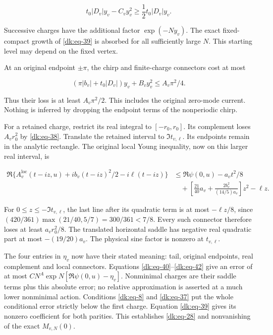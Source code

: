 \begin{equation}\label{dk:eq-40}
t_0|D_v|y_v-C_vy_v^2\ge\frac12t_0|D_v|y_v.
\end{equation}

Successive charges have the additional factor \(\exp(-Ny_v)\). The exact
fixed-compact growth of \eqref{dk:eq-39} is absorbed for all sufficiently large $N$.
This starting level may depend on the fixed vertex.

At an original endpoint \(\pm\pi\), the chirp and finite-charge connectors cost
at most

\begin{equation}\label{dk:eq-41}
(\pi|b_v|+t_0|D_v|)y_v+B_vy_v^2
                            \le A_v\pi^2/4.
\end{equation}

Thus their loss is at least \(A_v\pi^2/2\). This includes the original
zero-mode current. Nothing is inferred by dropping the endpoint terms
of the nonperiodic chirp.

For a retained charge, restrict its real integral to \([-r_0,r_0]\).
Its complement loses \(A_vr_0^2\) by \eqref{dk:eq-38}. Translate the retained interval
to \(\Im t_{v,\ell}\). Its endpoints remain in the analytic rectangle. The
original local Young inequality, now on this larger real interval,
is

\begin{equation}\label{dk:eq-42}
\begin{aligned}
 \Re\{A_v^{\mathrm{loc}}(t-iz,u)+ib_v(t-iz)^2/2-i\ell(t-iz)\}
 &\le\Re\psi(0,u)-a_vt^2/8\\
 &\quad+\left[\frac{21}{40}a_v+
                 \frac{2b_v^2}{(14/5)a_v}\right]z^2-\ell z.
\end{aligned}
\end{equation}

For \(0\le z\le-\Im t_{v,\ell}\), the last line after its quadratic term is
at most \(-\ell z/8\), since \((420/361)\max(21/40,5/7)=300/361<7/8\).
Every such connector therefore loses at least \(a_vr_0^2/8\).
The translated horizontal saddle has negative real quadratic part
at most \(-(19/20)a_v\). The physical sine factor is nonzero at \(t_{v,\ell}\).

The four entries in $\eta_v$ now have their stated meaning: tail,
original endpoints, real complement and local connectors.
Equations \eqref{dk:eq-40}--\eqref{dk:eq-42} give an error of at most
\(CN^A\exp N[\Re\psi(0,u)-\eta_v]\). Nonminimal charges are their saddle
terms plus this absolute error; no relative approximation is asserted
at a much lower nonminimal action. Conditions \eqref{dk:eq-8} and \eqref{dk:eq-37} put the
whole conditional error strictly below the first charge. Equation
\eqref{dk:eq-39} gives its nonzero coefficient for both parities. This establishes
\eqref{dk:eq-28} and nonvanishing of the exact \(M_{v,N}(0)\).

